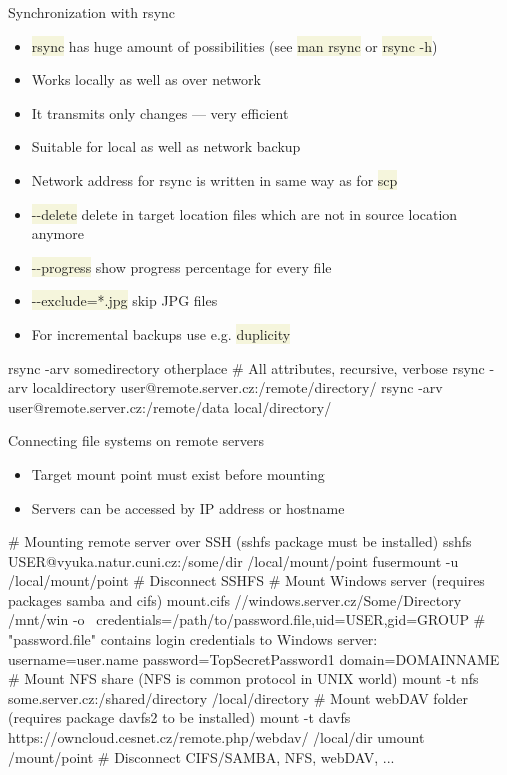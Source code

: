 \documentclass[compress, ucs, xelatex, 11pt, xcolor=svgnames, aspectratio=169,
	hyperref={
		bookmarks=true,
		unicode=true,
		colorlinks=true,
		pdftitle={Linux, command line and MetaCentrum},
		plainpages=false,
		pdfauthor={Vojtech Zeisek},
		pdfsubject={Course about use of Linux command line, writing shell scripts and using MetaCentrum of CESNET},
		pdfcreator={XeLaTeX},
		pdfkeywords={Linux, GNU, BASH, shell, command line, MetaCentrum},
		linkcolor=DarkRed, %
		anchorcolor=DarkBlue, %
		citecolor=Indigo, %
		filecolor=NavyBlue, %
		menucolor=DarkMagenta, %
		urlcolor=DarkBlue, %
		pdftex},
	url={hyphens, lowtilde} %
	]{beamer}
\renewcommand{\texttt}[1]{\colorbox{Beige}{{\ttfamily #1}}}
\begin{document}
\begin{frame}[fragile]{Synchronization with rsync}
	\begin{itemize}
		\item \texttt{rsync} has huge amount of possibilities (see \texttt{man rsync} or \texttt{rsync -h})
		\item Works locally as well as over network
		\item It transmits only changes --- very efficient
		\item Suitable for local as well as network backup
		\item Network address for rsync is written in same way as for \texttt{scp}
		\item \texttt{-{-}delete} delete in target location files which are not in source location anymore
		\item \texttt{-{-}progress} show progress percentage for every file
		\item \texttt{-{-}exclude=*.jpg} skip JPG files
		\item For incremental backups use e.g. \texttt{duplicity}
	\end{itemize}
	\vfill
	\begin{bashcode}
    rsync -arv somedirectory otherplace # All attributes, recursive, verbose
    rsync -arv localdirectory user@remote.server.cz:/remote/directory/
    rsync -arv user@remote.server.cz:/remote/data local/directory/
	\end{bashcode}
\end{frame}

\begin{frame}[fragile]{Connecting file systems on remote servers}
	\label{netfs}
	\begin{itemize}
		\item Target mount point must exist before mounting
		\item Servers can be accessed by IP address or hostname
	\end{itemize}
	\vfill
	\begin{bashcode}
    # Mounting remote server over SSH (sshfs package must be installed)
    sshfs USER@vyuka.natur.cuni.cz:/some/dir /local/mount/point
    fusermount -u /local/mount/point # Disconnect SSHFS
    # Mount Windows server (requires packages samba and cifs)
    mount.cifs //windows.server.cz/Some/Directory /mnt/win -o \
      credentials=/path/to/password.file,uid=USER,gid=GROUP
    # "password.file" contains login credentials to Windows server:
    username=user.name
    password=TopSecretPassword1
    domain=DOMAINNAME
    # Mount NFS share (NFS is common protocol in UNIX world)
    mount -t nfs some.server.cz:/shared/directory /local/directory
    # Mount webDAV folder (requires package davfs2 to be installed)
    mount -t davfs https://owncloud.cesnet.cz/remote.php/webdav/ /local/dir
    umount /mount/point # Disconnect CIFS/SAMBA, NFS, webDAV, ...
	\end{bashcode}
\end{frame}
\end{document}
